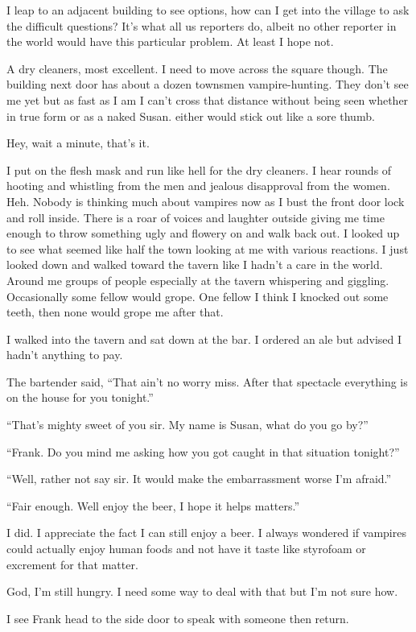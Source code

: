 I leap to an adjacent building to see options, how can I get into the village to ask the difficult questions? It's what all us reporters do, albeit no other reporter in the world would have this particular problem. At least I hope not.

A dry cleaners, most excellent. I need to move across the square though. The building next door has about a dozen townsmen vampire-hunting. They don't see me yet but as fast as I am I can't cross that distance without being seen whether in true form or as a naked Susan. either would stick out like a sore thumb.

Hey, wait a minute, that's it.

I put on the flesh mask and run like hell for the dry cleaners. I hear rounds of hooting and whistling from the men and jealous disapproval from the women. Heh. Nobody is thinking much about vampires now as I bust the front door lock and roll inside. There is a roar of voices and laughter outside giving me time enough to throw something ugly and flowery on and walk back out. I looked up to see what seemed like half the town looking at me with various reactions. I just looked down and walked toward the tavern like I hadn't a care in the world. Around me groups of people especially at the tavern whispering and giggling. Occasionally some fellow would grope. One fellow I think I knocked out some teeth, then none would grope me after that.

I walked into the tavern and sat down at the bar. I ordered an ale but advised I hadn't anything to pay.

The bartender said, ``That ain't no worry miss. After that spectacle everything is on the house for you tonight.''

``That's mighty sweet of you sir. My name is Susan, what do you go by?''

``Frank. Do you mind me asking how you got caught in that situation tonight?''

``Well, rather not say sir. It would make the embarrassment worse I'm afraid.''

``Fair enough. Well enjoy the beer, I hope it helps matters.''

I did. I appreciate the fact I can still enjoy a beer. I always wondered if vampires could actually enjoy human foods and not have it taste like styrofoam or excrement for that matter.

God, I'm still hungry. I need some way to deal with that but I'm not sure how.

I see Frank head to the side door to speak with someone then return.

